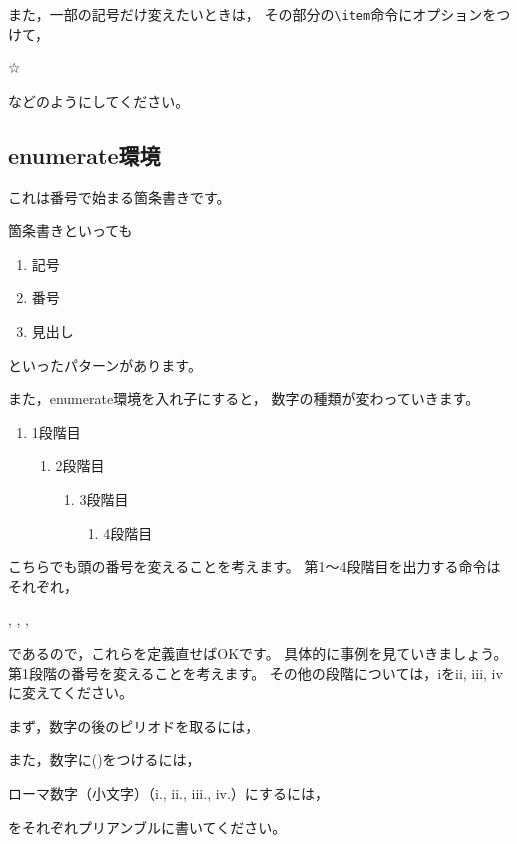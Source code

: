 \documentclass[class=jreport, crop=false, preview=false, dvipdfmx, fleqn]{standalone}
\begin{document}
また，一部の記号だけ変えたいときは，
その部分の\verb|\item|命令にオプションをつけて，
\begin{ITeX}
\item[☆]
\end{ITeX}
などのようにしてください。


\subsection{enumerate環境}
これは番号で始まる箇条書きです。

\begin{IOTeX}
箇条書きといっても
\begin{enumerate}
\item 記号
\item 番号
\item 見出し
\end{enumerate}
といったパターンがあります。
\end{IOTeX}

また，enumerate環境を入れ子にすると，
数字の種類が変わっていきます。

\begin{IOTeX}
\begin{enumerate}
\item 1段階目
  \begin{enumerate}
  \item 2段階目
       \begin{enumerate}
       \item 3段階目
           \begin{enumerate}
           \item 4段階目
           \end{enumerate}
        \end{enumerate}
  \end{enumerate}
\end{enumerate}
\end{IOTeX}

こちらでも頭の番号を変えることを考えます。
第1～4段階目を出力する命令はそれぞれ，
\begin{ITeX}
, , , 
\end{ITeX}
であるので，これらを定義直せばOKです。
具体的に事例を見ていきましょう。
第1段階の番号を変えることを考えます。
その他の段階については，iをii, iii, ivに変えてください。

まず，数字の後のピリオドを取るには，
\begin{ITeX}
\renewcommand{\labelitemi}{\theenumi}
\end{ITeX}
また，数字に()をつけるには，
\begin{ITeX}
\renewcommand{\labelitemi}{(\theenumi)}
\end{ITeX}
ローマ数字（小文字）（i., ii., iii., iv.）にするには，
\begin{ITeX}
\renewcommand{\theenumi}{\roman{enumi}}
\end{ITeX}
をそれぞれプリアンブルに書いてください。
\end{document}
